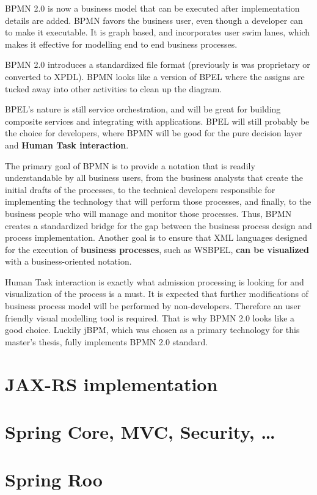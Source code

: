 	\cite{ms_bpmn_bpel}
	BPMN 2.0 is now a business model that can be executed after implementation details are added. BPMN favors the business
	user, even though a developer can  to make it executable. It is graph based, and
	incorporates user swim lanes, which makes it effective for modelling end to end business processes. 
	
	BPMN 2.0 introduces a standardized file format (previously is was proprietary or converted to XPDL). BPMN looks like a
	version of BPEL where the assigns are tucked away into other activities to clean up the diagram.

	BPEL's nature is still service orchestration, and will be great for building composite services and
	integrating with applications. BPEL will still probably be the choice for developers, where BPMN will be good for the
	pure decision layer and \textbf{Human Task interaction}.
	
	\cite[p.~1]{bpmn}
	The primary goal of BPMN is to provide a notation that is readily understandable by all business users, from the
	business analysts that create the initial drafts of the processes, to the technical developers responsible for
	implementing the technology that will perform those processes, and finally, to the business people who will manage and
	monitor those processes. Thus, BPMN creates a standardized bridge for the gap between the business process design and
	process implementation.
	Another goal  is to ensure that XML languages designed for the execution of \textbf{business processes}, such as
	\gls{WSBPEL}, \textbf{can be visualized} with a business-oriented notation.
	
	Human Task interaction is exactly what admission processing is looking for and visualization of the process is a must.
	It is expected that further modifications of business process model will be performed by non-developers. Therefore an
	user friendly visual modelling tool is required. That is why BPMN 2.0 looks like a good choice. Luckily jBPM, which was
	chosen as a primary technology for this master's thesis, fully implements BPMN 2.0 standard.
	
	\section{JAX-RS implementation}
	
	\section{Spring Core, MVC, Security, \ldots}
	
	\section{Spring Roo}